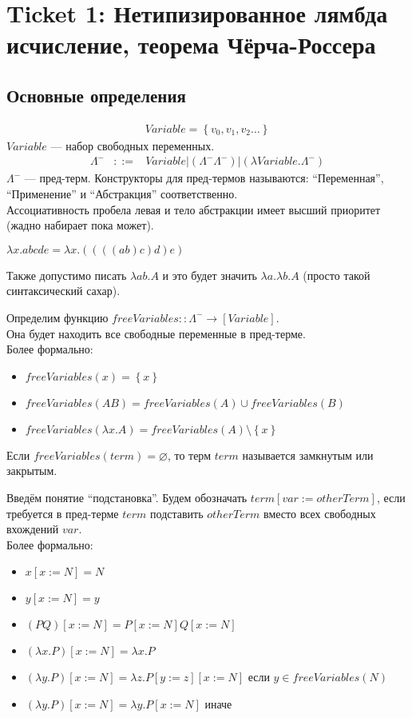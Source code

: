 \section{Ticket 1: Нетипизированное лямбда исчисление, теорема Чёрча-Россера}
\label{sec-2}
\subsection{Основные определения}
\label{sec-2-1}
\begin{eqnarray*}
Variable = \left\{v_0, v_1, v_2 \dots\right\}
\end{eqnarray*}
$Variable$ --- набор свободных переменных.
\begin{eqnarray*}
\Lambda^- &::=& Variable |
(\Lambda^- \Lambda^-) |
(\lambda Variable . \Lambda^-)
\end{eqnarray*}
$\Lambda^-$ --- пред-терм.
Конструкторы для пред-термов называются:
``Переменная'', ``Применение'' и ``Абстракция'' соответственно. \\
Ассоциативность пробела левая и тело абстракции имеет высший приоритет
(жадно набирает пока может).
\begin{example}
$\lambda x . a b c d e = \lambda x . ((((a b) c) d) e)$
\end{example}
Также допустимо писать $\lambda a b . A$ и это будет значить
$\lambda a . \lambda b . A$ (просто такой синтаксический сахар).

\begin{definition}
Определим функцию $freeVariables :: \Lambda^- \to [Variable]$. \\
Она будет находить все свободные переменные в пред-терме. \\
Более формально:
\begin{itemize}
\item $freeVariables(x) = \left\{x\right\}$
\item $freeVariables(A B) = freeVariables(A) \cup freeVariables(B)$
\item $freeVariables(\lambda x . A) = freeVariables(A) \setminus \left\{x\right\}$
\end{itemize}
Если $freeVariables(term) = \varnothing$, то терм $term$ называется замкнутым или
закрытым.
\end{definition}
\begin{definition}
Введём понятие ``подстановка''.
Будем обозначать $term[var:=otherTerm]$, если требуется в пред-терме $term$
подставить $otherTerm$ вместо всех свободных вхождений $var$. \\
Более формально:
\begin{itemize}
\item $x[x:=N] = N$
\item $y[x:=N] = y$
\item $(P Q)[x:=N] = P[x:=N] Q[x:=N]$
\item $(\lambda x . P)[x:=N] = \lambda x . P$
\item $(\lambda y . P)[x:=N] = \lambda z . P[y:=z][x:=N]$ если $y \in freeVariables(N)$
\item $(\lambda y . P)[x:=N] = \lambda y . P[x:=N]$ иначе
\end{itemize}
\end{definition}
